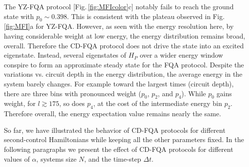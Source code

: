 \documentclass[twocolumn,aps,superscriptaddress,floatfix,longbibliography]{revtex4-2}
\newcommand{\Fig}[1]{Fig.\,\ref{fig:#1}}
\begin{document}
The YZ-FQA protocol [\Fig{MFIcolor}c]
notably fails to reach the
ground state with %
$p_0 \sim 0.398$.
This is consistent with the plateau observed in \Fig{MFI}a
for YZ-FQA. However, as seen with the energy resolution here,
by having considerable weight at low
energy, the energy distribution remains broad, overall.
Therefore the CD-FQA protocol does not drive
the state into an excited eigenstate. Instead, several
eigenstates of $H_P$ over a wider energy window conspire
to form an approximate steady state for the FQA protocol.
Despite the variations vs. circuit depth in the
energy distribution, the average energy in the system
barely changes. For example toward the largest times
(circuit depth), there are three bins
with pronounced weight ($p_0$, $p_2$, and $p_4$).
While $p_0$ gains weight, for $l\gtrsim 175$,
so does $p_4$, at the cost of the intermediate 
energy bin $p_2$. Therefore overall, the energy
expectation value remains nearly the same.

 
%

So far, we have illustrated the behavior of CD-FQA protocols for different second-control Hamiltonians while keeping all the other parameters fixed. In the following paragraphs we present the effect of CD-FQA protocols for different values of $\alpha$, systems size $N$, and the time-step $\Delta t$.
\end{document}
